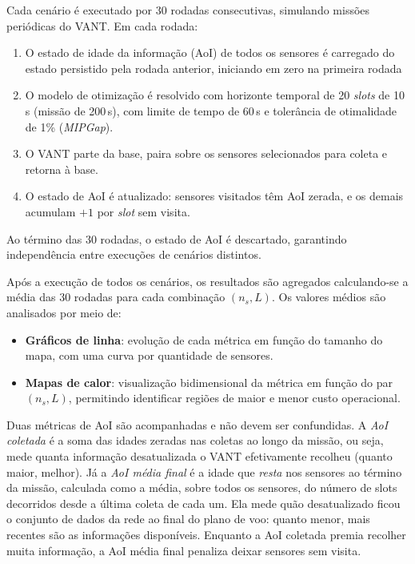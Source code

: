 Cada cenário é executado por 30 rodadas consecutivas, simulando missões periódicas do VANT. Em cada rodada:

\begin{enumerate}
\item O estado de idade da informação (AoI) de todos os sensores é carregado do estado persistido pela rodada anterior, iniciando em zero na primeira rodada
\item O modelo de otimização é resolvido com horizonte temporal de 20 \textit{slots} de 10\,s (missão de 200\,s), com limite de tempo de 60\,s e tolerância de otimalidade de 1\% (\textit{MIPGap}). 
\item O VANT parte da base, paira sobre os sensores selecionados para coleta e retorna à base.
\item O estado de AoI é atualizado: sensores visitados têm AoI zerada, e os demais acumulam $+1$ por \textit{slot} sem visita.
\end{enumerate}
 

Ao término das 30 rodadas, o estado de AoI é descartado, garantindo independência entre execuções de cenários distintos. 

Após a execução de todos os cenários, os resultados são agregados calculando-se a média das 30 rodadas para cada combinação $(n_s, L)$. Os valores médios são analisados por meio de:
                                                                         
\begin{itemize}
\item \textbf{Gráficos de linha}: evolução de cada métrica em função do tamanho do mapa, com uma curva por quantidade de sensores.
\item \textbf{Mapas de calor}: visualização bidimensional da métrica em função do par $(n_s, L)$, permitindo identificar regiões de maior e menor custo operacional.
\end{itemize}

Duas métricas de AoI são acompanhadas e não devem ser confundidas. A \emph{AoI coletada} é a soma das idades zeradas nas coletas ao longo da missão, ou seja, mede quanta informação desatualizada o VANT efetivamente recolheu (quanto maior, melhor). Já a \emph{AoI média final} é a idade que \emph{resta} nos sensores ao término da missão, calculada como a média, sobre todos os sensores, do número de slots decorridos desde a última coleta de cada um. Ela mede quão desatualizado ficou o conjunto de dados da rede ao final do plano de voo: quanto menor, mais recentes são as informações disponíveis. Enquanto a AoI coletada premia recolher muita informação, a AoI média final penaliza deixar sensores sem visita.



